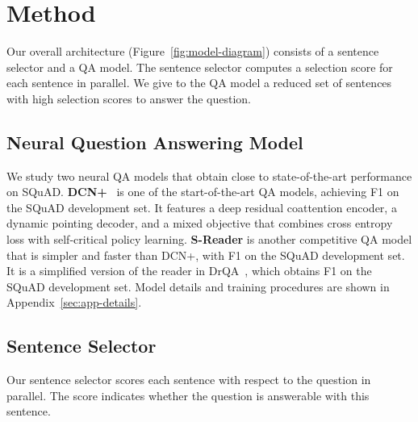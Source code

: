 \documentclass[11pt,a4paper]{article}
\begin{document}
 \section{Method}\label{sec:method}\begin{figure*}[!tb]
\centering
{}
\caption{
Our model architecture.
(a) Overall pipeline, consisting of sentence selector and QA model. Selection score of each sentence is obtained in parallel, then sentences with selection score above the threshold are merged and fed into QA model.
(b) Shared encoder of sentence selector and S-Reader (QA Model), which takes document and the question as inputs and outputs the document encodings  and question encodings .
(c) Decoder of S-Reader (QA Model), which takes  and  as inputs and outputs the scores for start and end positions.
(d) Decoder of sentence selector, which takes  and  for each sentence and outputs the score indicating if the question is answerable given the sentence.
}
\label{fig:model-diagram}
\end{figure*}

Our overall architecture (Figure~\ref{fig:model-diagram}) consists of a sentence selector and a QA model. The sentence selector computes a selection score for each sentence in parallel. We give to the QA model a reduced set of sentences with high selection scores to answer the question.

\subsection{Neural Question Answering Model}\label{sec:method-qa-model}
We study two neural QA models that obtain close to state-of-the-art performance on SQuAD.
{\bf DCN+}~\cite{dcn+} is one of the start-of-the-art QA models, achieving  F1 on the SQuAD development set. It features a deep residual coattention encoder, a dynamic pointing decoder, and a mixed objective that combines cross entropy loss with self-critical policy learning.
{\bf S-Reader} is another competitive QA model that is simpler and faster than DCN+, with  F1 on the SQuAD development set.
It is a simplified version of the reader in DrQA~\cite{squad-open}, which obtains  F1 on the SQuAD development set.
Model details and training procedures are shown in Appendix~\ref{sec:app-details}.

\subsection{Sentence Selector}\label{sec:method-sent-sel}
Our sentence selector scores each sentence with respect to the question in parallel. The score indicates whether the question is answerable with this sentence.
\end{document}
